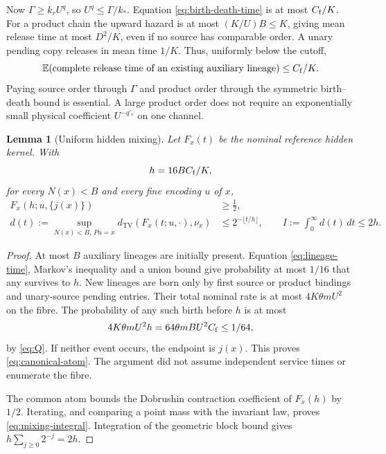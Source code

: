 \documentclass[11pt,reqno]{amsart}
\newtheorem{lemma}[theorem]{Lemma}
\theoremstyle{definition}
\theoremstyle{remark}
\newcommand{\E}{\mathbb E}
\newcommand{\TV}{d_{\mathrm{TV}}}
\begin{document}
Now $\Gamma\ge k_r U^q$, so $U^q\le\Gamma/k_*$. Equation
\eqref{eq:birth-death-time} is at most $C_{\rm f}/K$.
For a product chain the upward hazard is at most $(K/U)B\le K$, giving mean
release time at most $D^2/K$, even if no source has comparable order. A unary
pending copy releases in mean time $1/K$. Thus, uniformly below the cutoff,
\begin{equation}\label{eq:lineage-time}
 \E(\text{complete release time of an existing auxiliary lineage})
 \le C_{\rm f}/K.
\end{equation}
Paying source order through $\Gamma$ and product order through the symmetric
birth--death bound is essential. A large product order does not require an
exponentially small physical coefficient $U^{-q'_r}$ on one channel.

\begin{lemma}[Uniform hidden mixing]\label{lem:mixing}
Let $F_x(t)$ be the nominal reference hidden kernel. With
\begin{equation}\label{eq:mixing-h}
 h=16BC_{\rm f}/K,
\end{equation}
for every $N(x)<B$ and every fine encoding $u$ of $x$,
\begin{align}
 F_x(h;u,\{j(x)\})&\ge\tfrac12,\label{eq:canonical-atom}\\
 d(t):=\sup_{N(x)<B,\,Pu=x}\TV(F_x(t;u,\cdot),\nu_x)
 &\le2^{-\lfloor t/h\rfloor},\qquad
 I:=\int_0^\infty d(t)\,dt\le2h.\label{eq:mixing-integral}
\end{align}
\end{lemma}
\begin{proof}
At most $B$ auxiliary lineages are initially present. Equation
\eqref{eq:lineage-time}, Markov's inequality and a union bound give probability
at most $1/16$ that any survives to $h$. New lineages are born only by first
source or product bindings and unary-source pending entries. Their total
nominal rate is at most $4K\theta m U^2$ on the fibre. The probability of any
such birth before $h$ is at most
\[
 4K\theta mU^2h=64\theta mBU^2C_{\rm f}\le1/64,
\]
by \eqref{eq:Q}. If neither event occurs, the endpoint is $j(x)$.
This proves \eqref{eq:canonical-atom}. The argument did not assume independent
service times or enumerate the fibre.

The common atom bounds the Dobrushin contraction coefficient of $F_x(h)$ by
$1/2$. Iterating, and comparing a point mass with the invariant law, proves
\eqref{eq:mixing-integral}. Integration of the geometric block bound gives
$h\sum_{j\ge0}2^{-j}=2h$.
\end{proof}
\end{document}
